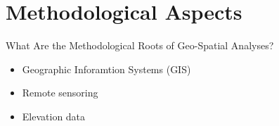 \documentclass[show notes, aspectratio=1610]{beamer}
\begin{document}
\section{Methodological Aspects}

\begin{frame}{What Are the Methodological Roots of Geo-Spatial Analyses?}
	\begin{itemize}
		\item
		      Geographic Inforamtion Systems (GIS)
		\item
		      Remote sensoring
		\item
		      Elevation data
	\end{itemize}
\end{frame}
\end{document}
